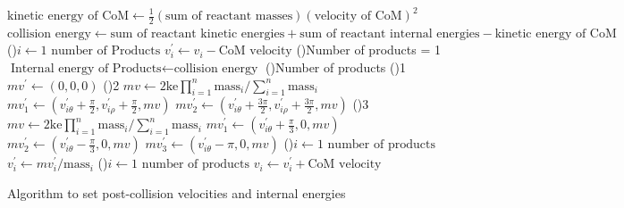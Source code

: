 \begin{algorithm}
	$\text{kinetic energy of CoM}\leftarrow \frac{1}{2}(\text{sum of reactant masses})(\text{velocity of CoM})^2$\;
	\BlankLine
	$\text{collision energy}\leftarrow \text{sum of reactant kinetic energies}+\text{sum of reactant internal energies}-\text{kinetic energy of CoM}$\;
	\BlankLine
	\For(){$i\leftarrow 1$ \KwTo $\text{number of Products}$}{\label{alg:lab_to_CoM_frame}
		$v^\prime_i\leftarrow v_i-\text{CoM velocity}$\;
	}
	\BlankLine
	\uIf(){Number of products = 1}{\label{alg:allocate_energies}
		$\text{Internal energy of Products}\leftarrow \text{collision energy}$\;
	}
	\BlankLine
	\Switch(){Number of products}{
		\uCase(){1}{
			$mv^\prime\leftarrow (0,0,0)$\;
		}
		\uCase(){2}{\label{alg:2products}
			$mv\leftarrow 2\text{ke}\prod\limits_{i=1}^n \text{mass}_i/\sum\limits_{i=1}^n \text{mass}_i$\;
			$mv^\prime_1\leftarrow (v^\prime_{i\theta}+\frac{\pi}{2},v^\prime_{i\rho}+\frac{\pi}{2},mv)$\;
			$mv^\prime_2\leftarrow (v^\prime_{i\theta}+\frac{3\pi}{2},v^\prime_{i\rho}+\frac{3\pi}{2},mv)$\;
		}
		\uCase(){3}{\label{alg:3products}
			$mv\leftarrow 2\text{ke}\prod\limits_{i=1}^n \text{mass}_i/\sum\limits_{i=1}^n \text{mass}_i$\;
			$mv^\prime_1\leftarrow (v^\prime_{i\theta}+\frac{\pi}{3},0,mv)$\;
			$mv^\prime_2\leftarrow (v^\prime_{i\theta}-\frac{\pi}{3},0,mv)$\;
			$mv^\prime_3\leftarrow (v^\prime_{i\theta}-\pi,0,mv)$\;
		}
	}
	\BlankLine
	\For(){$i\leftarrow 1$ \KwTo $\text{number of products}$}{
		$v^\prime_i\leftarrow mv^\prime_i / \text{mass}_i$\;
	}
	\BlankLine
	\For(){$i\leftarrow 1$ \KwTo $\text{number of products}$}{\label{alg:CoM_to_lab_frame}
		$v_i\leftarrow v^\prime_i+\text{CoM velocity}$\;
	}
	\caption{Algorithm to set post-collision velocities and internal energies}\label{alg:post_collision_adjustments}
\end{algorithm}



